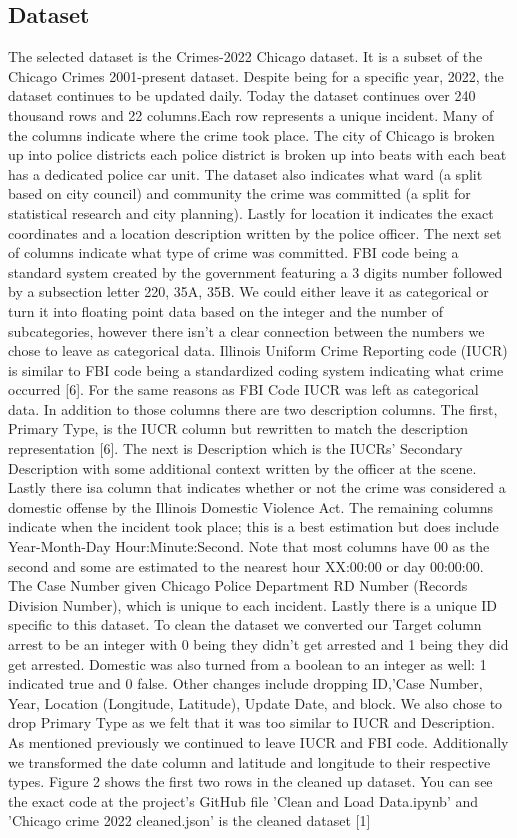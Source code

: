 \documentclass[conference]{IEEEtran}
\begin{document}
\subsection{Dataset}
The selected dataset is the Crimes-2022 Chicago dataset. It is a subset of the Chicago Crimes 2001-present dataset. Despite being for a specific year, 2022, the dataset continues to be updated daily. Today the dataset continues over 240 thousand rows and 22 columns.Each row represents a unique incident. Many of the columns indicate where the crime took place. The city of Chicago is broken up into police districts each police district is broken up into beats with each beat has a dedicated police car unit. The dataset also indicates what ward (a split based on city council) and community the crime was committed (a split for statistical research and city planning). Lastly for location it indicates the exact coordinates and a location description written by the police officer. 
The next set of columns indicate what type of crime was committed. FBI code being a standard system created by the government featuring a 3 digits number followed by a subsection letter 220, 35A, 35B. We could either leave it as categorical or turn it into floating point data based on the integer and the number of subcategories, however there isn't a clear connection between the numbers we chose to leave as categorical data. Illinois Uniform Crime Reporting code (IUCR) is similar to FBI code being a standardized coding system indicating what crime occurred [6]. For the same reasons as FBI Code IUCR was left as categorical data. In addition to those columns there are two description columns. The first, Primary Type, is the IUCR column but rewritten to match the description representation [6]. The next is Description which is the IUCRs’ Secondary Description with some additional context written by the officer at the scene. Lastly there isa column that indicates whether or not the crime was considered a domestic offense by the Illinois Domestic Violence Act. 
The remaining columns indicate when the incident took place; this is a best estimation but does include Year-Month-Day Hour:Minute:Second. Note that most columns have 00 as the second and some are estimated to the nearest hour XX:00:00 or day 00:00:00. The Case Number given Chicago Police Department RD Number (Records Division Number), which is unique to each incident. Lastly there is a unique ID specific to this dataset. 
To clean the dataset we converted our Target column arrest to be an integer with 0 being they didn't get arrested and 1 being they did get arrested. Domestic was also turned from a boolean to an integer as well: 1 indicated true and 0 false. Other changes include dropping ID,'Case Number, Year, Location (Longitude, Latitude), Update Date, and block. We also chose to drop Primary Type as we felt that it was too similar to IUCR and Description. As mentioned previously we continued to leave IUCR and FBI code. Additionally we transformed the date column and latitude and longitude to their respective types. Figure 2 shows the first two rows in the cleaned up dataset. You can see the exact code at the project's GitHub file 'Clean and Load Data.ipynb' and 'Chicago crime 2022 cleaned.json' is the cleaned dataset [1]
\end{document}
